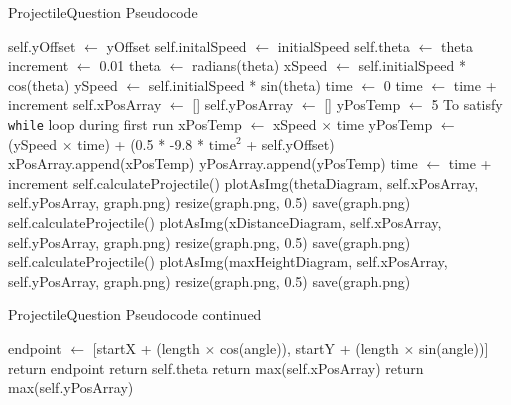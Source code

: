 \begin{algorithm}[H]
	\label{projectilequestionps}
	\caption{ProjectileQuestion Pseudocode}
	\begin{algorithmic}[1]
		 {}
		\State self.yOffset $\gets$ yOffset
		\State self.initalSpeed $\gets$ initialSpeed
		\State self.theta $\gets$ theta
		\EndFunction
		\State increment $\gets$ 0.01
		\State theta $\gets$ radians(theta)
		\State xSpeed $\gets$ self.initialSpeed * cos(theta)
		\State ySpeed $\gets$ self.initialSpeed * sin(theta)
		\State time $\gets$ 0
		\State time $\gets$ time + increment
		\State self.xPosArray $\gets$ []
		\State self.yPosArray $\gets$ []
		\State yPosTemp $\gets$ 5 \Comment To satisfy \texttt{while} loop during first run
		\State xPosTemp $\gets$ xSpeed $\times$ time
		\State yPosTemp $\gets$ (ySpeed $\times$ time) + (0.5 * -9.8 * $\textrm{time}^2$ + self.yOffset) 
		\State xPosArray.append(xPosTemp)
		\State yPosArray.append(yPosTemp)
		\State time $\gets$ time + increment
		\EndWhile
		\EndFunction
		\State self.calculateProjectile()
		\State plotAsImg(thetaDiagram, self.xPosArray, self.yPosArray, graph.png)
		\State resize(graph.png, 0.5)
		\State save(graph.png)
		\EndFunction
		\State self.calculateProjectile()
		\State plotAsImg(xDistanceDiagram, self.xPosArray, self.yPosArray, graph.png)
		\State resize(graph.png, 0.5)
		\State save(graph.png)
		\EndFunction
		\State self.calculateProjectile()
		\State plotAsImg(maxHeightDiagram, self.xPosArray, self.yPosArray, graph.png)
		\State resize(graph.png, 0.5)
		\State save(graph.png)
		\EndFunction
		
	\end{algorithmic}
\end{algorithm}
\clearpage
\begin{algorithm}[H]
	\caption{ProjectileQuestion Pseudocode continued}
	\begin{algorithmic}[1]
		\State endpoint $\gets$ [startX + (length $\times$ cos(angle)), startY + (length $\times$ sin(angle))]
		\State return endpoint
		\EndFunction
		\State return self.theta
		\EndFunction 
		\State return max(self.xPosArray)
		\EndFunction
		\State return max(self.yPosArray)
		\EndFunction
		\EndProcedure
	\end{algorithmic}
\end{algorithm}
